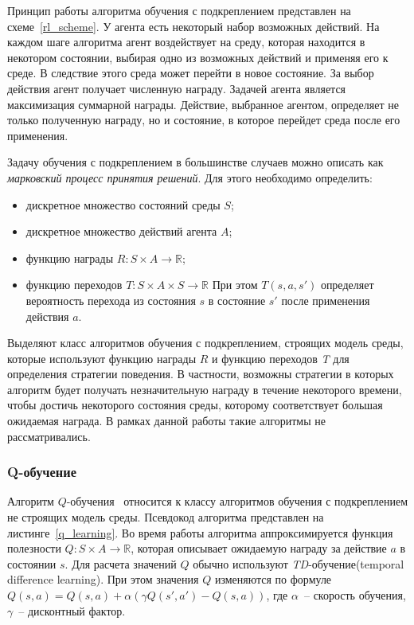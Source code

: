 Принцип работы алгоритма обучения с подкреплением представлен на схеме~\ref{rl_scheme}. У агента есть некоторый набор возможных действий. На каждом шаге алгоритма агент воздействует на среду, которая находится в некотором состоянии, выбирая одно из возможных действий и применяя его к среде. В следствие этого среда может перейти в новое состояние. За выбор действия агент получает численную награду. Задачей агента является максимизация суммарной награды. Действие, выбранное агентом, определяет не только полученную награду, но и состояние, в которое перейдет среда после его применения.

Задачу обучения с подкреплением в большинстве случаев можно описать как \textit{марковский процесс принятия решений}. Для этого необходимо определить:

\begin{itemize}
    \item дискретное множество состояний среды $S$;
    \item дискретное множество действий агента $A$;
    \item функцию награды $R : S \times A \rightarrow \mathbb{R}$;
    \item функцию переходов $T : S \times A \times S \rightarrow \mathbb{R}$ При этом $T(s, a, s')$ определяет вероятность перехода из состояния $s$ в состояние $s'$ после применения действия $a$.
\end{itemize}

Выделяют класс алгоритмов обучения с подкреплением, строящих модель среды, которые используют функцию награды $R$ и функцию переходов \textit{T} для определения стратегии поведения. В частности, возможны стратегии в которых алгоритм будет получать незначительную награду в течение некоторого времени, чтобы достичь некоторого состояния среды, которому соответствует большая ожидаемая награда. В рамках данной работы такие алгоритмы не рассматривались.

\subsubsection{Q-обучение}

Алгоритм $Q$-обучения~\cite{systems, watkins} относится к классу алгоритмов обучения с подкреплением не строящих модель среды. Псевдокод алгоритма представлен на листинге~\ref{q_learning}. Во время работы алгоритма аппроксимируется функция полезности $Q : S \times A \rightarrow \mathbb{R}$, которая описывает ожидаемую награду за действие $a$ в состоянии $s$. Для расчета значений $Q$ обычно используют \textit{TD}-обучение(temporal difference learning). При этом значения $Q$ изменяются по формуле $Q(s, a) = Q(s, a) + \alpha (\gamma Q(s', a') - Q(s, a))$, где $\alpha$~-- скорость обучения, $\gamma$~-- дисконтный фактор.

